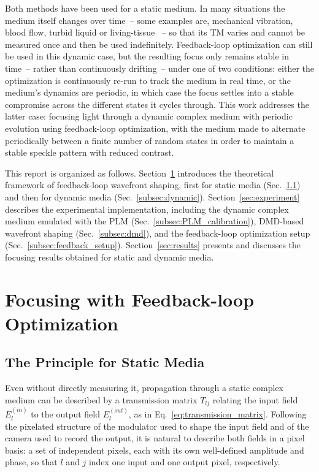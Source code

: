 \documentclass[11pt, twoside]{article}
\begin{document}
Both methods have been used for a static medium. In many situations the medium itself changes over time~-- some examples are, mechanical vibration, blood flow, turbid liquid or living-tissue ~-- so that its TM varies and cannot be measured once and then be used indefinitely. Feedback-loop optimization can still be used in this dynamic case, but the resulting focus only remains stable in time~-- rather than continuously drifting~-- under one of two conditions: either the optimization is continuously re-run to track the medium in real time, or the medium's dynamics are periodic, in which case the focus settles into a stable compromise across the different states it cycles through. This work addresses the latter case: focusing light through a dynamic complex medium with periodic evolution using feedback-loop optimization, with the medium made to alternate periodically between a finite number of random states in order to maintain a stable speckle pattern with reduced contrast.

This report is organized as follows. Section~\ref{sec:theory} introduces the theoretical framework of feedback-loop wavefront shaping, first for static media (Sec.~\ref{subsec:static}) and then for dynamic media (Sec.~\ref{subsec:dynamic}). Section~\ref{sec:experiment} describes the experimental implementation, including the dynamic complex medium emulated with the PLM (Sec.~\ref{subsec:PLM_calibration}), DMD-based wavefront shaping (Sec.~\ref{subsec:dmd}), and the feedback-loop optimization setup (Sec.~\ref{subsec:feedback_setup}). Section~\ref{sec:results} presents and discusses the focusing results obtained for static and dynamic media.

\section{Focusing with Feedback-loop Optimization}
\label{sec:theory}

\subsection{The Principle for Static Media}
\label{subsec:static}

Even without directly measuring it, propagation through a static complex medium can be described by a transmission matrix $T_{lj}$ relating the input field $E_l^{(in)}$ to the output field $E_l^{(out)}$, as in Eq.~\eqref{eq:transmission_matrix}. Following the pixelated structure of the modulator used to shape the input field and of the camera used to record the output, it is natural to describe both fields in a pixel basis: a set of independent pixels, each with its own well-defined amplitude and phase, so that $l$ and $j$ index one input and one output pixel, respectively.
\end{document}
